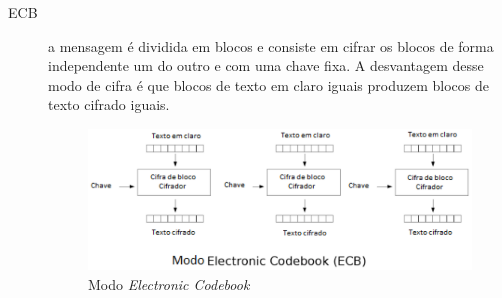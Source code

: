 \begin{description}
\item [ECB] a mensagem é dividida em blocos e consiste em cifrar os blocos de forma independente um do outro e com uma chave fixa. A desvantagem desse modo de cifra é que blocos de texto em claro iguais produzem blocos de texto cifrado iguais.
\begin{figure}[h]
\centering
\includegraphics[keepaspectratio=true,scale=1.0]
	{figuras/ecb.eps}
	\caption[Modo Electronic Codebook]{Modo \textit{Electronic Codebook}\protect\footnotemark}
	

\end{figure}
\end{description}
